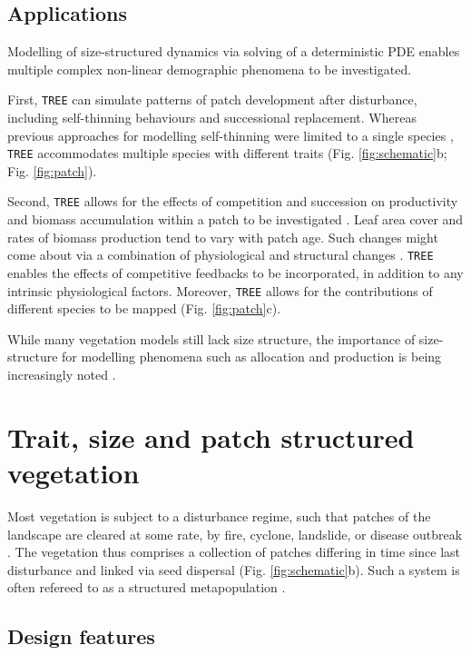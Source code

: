 \documentclass[a4paper,11pt]{article}
\begin{document}
\subsection{Applications}

Modelling of size-structured dynamics via solving of a deterministic PDE
enables multiple complex non-linear demographic phenomena to be
investigated.

First, \texttt{TREE} can simulate patterns of patch development after
disturbance, including self-thinning behaviours and successional
replacement. Whereas previous approaches for modelling self-thinning
were limited to a single species
\citep[e.g.][]{Barnes-2004, Coomes-2007}, \texttt{TREE} accommodates multiple
 species with different traits (Fig. \ref{fig:schematic}b; Fig.
\ref{fig:patch}).

Second, \texttt{TREE} allows for the effects of competition and succession on
productivity and biomass accumulation within a patch to be investigated
\citep{Falster-2011}. Leaf area cover and rates of biomass production
tend to vary with patch age. Such changes might come about via a
combination of physiological and structural changes
\citep{Binkley-2002, Smith-2001, Ogawa-2010, Coomes-2007}. \texttt{TREE} enables
the effects of competitive feedbacks to be incorporated, in addition to
any intrinsic physiological factors. Moreover, \texttt{TREE} allows for the
contributions of different species to be mapped (Fig. \ref{fig:patch}c).

While many vegetation models still lack size structure, the importance of
size-structure for modelling phenomena such as allocation and production is
being increasingly noted \citep{Moorcroft-2001, Dekauwe-2014, Falster-2011}.

\section{Trait, size and patch structured vegetation}

Most vegetation is subject to a disturbance regime, such that patches of
the landscape are cleared at some rate, by fire, cyclone, landslide, or
disease outbreak
\citep{Connell-1978, White-1979, Chambers-2013, Bormann-1979, Clark-1991, Coomes-2007}.
The vegetation thus comprises a collection of patches differing in time
since last disturbance and linked via seed dispersal (Fig.
\ref{fig:schematic}b). Such a system is often refereed to as a
structured metapopulation \citep{Gyllenberg-2001}.

\subsection{Design features}
\end{document}

